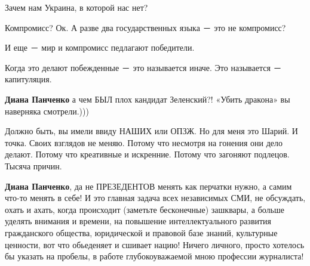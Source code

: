 \begin{itemize}
\begin{itemize}
Зачем нам Украина, в которой нас нет?

Компромисс? Ок. А разве два государственных языка － это не компромисс?

И еще － мир и компромисс педлагают победители.

Когда это делают побежденные － это называется иначе. Это называется －
капитуляция.

 
\textbf{Диана Панченко} а чем БЫЛ плох кандидат Зеленский?! «Убить дракона» вы наверняка смотрели.)))

 

Должно быть, вы имели ввиду НАШИХ или ОПЗЖ. Но для меня это Шарий. И точка.
Своих взглядов не меняю. Потому что несмотря на гонения они дело делают. Потому
что креативные и искренние. Потому что загоняют подлецов. Тысяча причин.

 
\textbf{Диана Панченко}, да не ПРЕЗЕДЕНТОВ менять как перчатки нужно, а самим
что-то менять в себе! И это главная задача всех независимых СМИ, не обсуждать,
охать и ахать, когда происходит (заметьте бесконечные) зашквары, а больше
уделять внимания и времени, на повышение интеллектуального развития
гражданского общества, юридической и правовой базе знаний, культурные ценности,
вот что обьеденяет и сшивает нацию! Ничего личного, просто хотелось бы указать
на пробелы, в работе глубокоуважаемой мною профессии журналиста!


 

\end{itemize}
\end{itemize}
